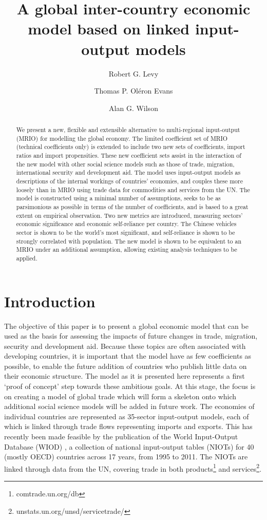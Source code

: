 \documentclass{article}
\title{A global inter-country economic model based on linked input-output models}
\author[*]{Robert G. Levy}
\author[**]{Thomas P. Ol\'{e}ron Evans}
\author[*]{Alan G. Wilson}
\affil[*]{Centre for Advanced Spatial Analysis, UCL Bartlett Faculty of the Built Environment,
90 Tottenham Court Road, London W1T 4TJ, UK}
\affil[**]{Department of Mathematics, University College London, Gower Street, London WC1E 6BT, UK}
\begin{document}
\maketitle

\begin{abstract}
We present a new, flexible and extensible alternative to multi-regional input-output (MRIO) for modelling the global economy.
The limited coefficient set of MRIO (technical coefficients only) is extended to include two new sets of coefficients, import ratios and import propensities.
These new coefficient sets assist in the interaction of the new model with other social science models such as those of trade, migration, international security and development aid.
The model uses input-output models as descriptions of the internal workings of countries' economies, and couples these more loosely than in MRIO using trade data for commodities and services from the UN.
The model is constructed using a minimal number of assumptions, seeks to be as parsimonious as possible in terms of the number of coefficients, and is based to a great extent on empirical observation.
Two new metrics are introduced, measuring sectors' economic significance and economic self-reliance per country.
The Chinese vehicles sector is shown to be the world's most significant, and self-reliance is shown to be strongly correlated with population.
The new model is shown to be equivalent to an MRIO under an additional assumption, allowing existing analysis techniques to be applied.
\end{abstract}

\section{Introduction}
The objective of this paper is to present a global economic model that can be used as the basis for assessing the impacts of future changes in trade, migration, security and development aid.
Because these topics are often associated with developing countries, it is important that the model have as few coefficients as possible, to enable the future addition of countries who publish little data on their economic structure.
The model as it is presented here represents a first `proof of concept' step towards these ambitious goals.
At this stage, the focus is on creating a model of global trade which will form a skeleton onto which additional social science models will be added in future work.
The economies of individual countries are represented as 35-sector input-output models, each of which is linked through trade flows representing imports and exports.
This has recently been made feasible by the publication of the World Input-Output Database (WIOD) \parencite{timmer_world_2012}, a collection of national input-output tables (NIOTs) for 40 (mostly OECD) countries across 17 years, from 1995 to 2011.
The NIOTs are linked through data from the UN, covering trade in both products\footnote{comtrade.un.org/db} and services\footnote{unstats.un.org/unsd/servicetrade/}.
\end{document}
